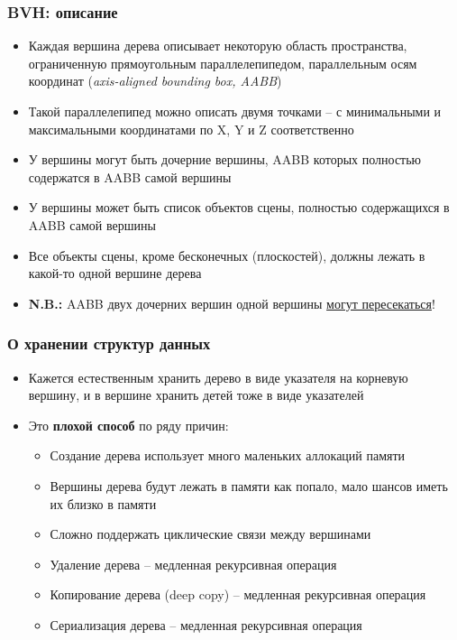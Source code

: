 \documentclass[handout,10pt]{beamer}
\begin{document}
\begin{frame}[fragile]
\frametitle{BVH: описание}
\begin{itemize}
\item Каждая вершина дерева описывает некоторую область пространства, ограниченную прямоугольным параллелепипедом, параллельным осям координат (\textit{axis-aligned bounding box, AABB})
\pause
\item Такой параллелепипед можно описать двумя точками -- с минимальными и максимальными координатами по X, Y и Z соответственно
\pause
\item У вершины могут быть дочерние вершины, AABB которых полностью содержатся в AABB самой вершины
\pause
\item У вершины может быть список объектов сцены, полностью содержащихся в AABB самой вершины
\pause
\item Все объекты сцены, кроме бесконечных (плоскостей), должны лежать в какой-то одной вершине дерева
\pause
\item \textbf{\alert{N.B.:}} AABB двух дочерних вершин одной вершины \underline{могут пересекаться}!
\end{itemize}
\end{frame}

\begin{frame}[fragile]
\frametitle{О хранении структур данных}
\begin{itemize}
\item Кажется естественным хранить дерево в виде указателя на корневую вершину, и в вершине хранить детей тоже в виде указателей
\pause
\item Это \textbf{плохой способ} по ряду причин:
\pause
\begin{itemize}
\item Создание дерева использует много маленьких аллокаций памяти
\pause
\item Вершины дерева будут лежать в памяти как попало, мало шансов иметь их близко в памяти
\pause
\item Сложно поддержать циклические связи между вершинами
\pause
\item Удаление дерева -- медленная рекурсивная операция
\pause
\item Копирование дерева (deep copy) -- медленная рекурсивная операция
\pause
\item Сериализация дерева -- медленная рекурсивная операция
\end{itemize}
\end{itemize}
\end{frame}
\end{document}
